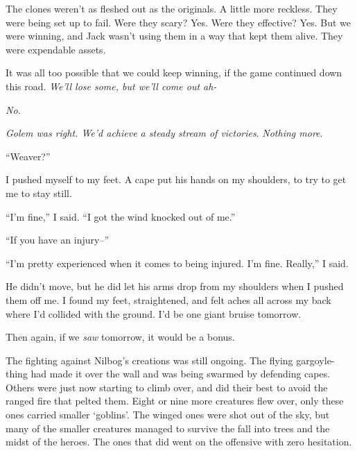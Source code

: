 The clones weren't as fleshed out as the originals.  A little more reckless.  They were being set up to fail.  Were they scary?  Yes.  Were they effective?  Yes.  But we were winning, and Jack wasn't using them in a way that kept them alive.  They were expendable assets.



It was all too possible that we could keep winning, if the game continued down this road.  \emph{We'll lose some, but we'll come out ah-}



\emph{No.}



\emph{Golem was right.  We'd achieve a steady stream of victories}.  \emph{Nothing more}.



``Weaver?''



I pushed myself to my feet.  A cape put his hands on my shoulders, to try to get me to stay still.



``I'm fine,'' I said.  ``I got the wind knocked out of me.''



``If you have an injury--''



``I'm pretty experienced when it comes to being injured.  I'm fine.  Really,'' I said.



He didn't move, but he did let his arms drop from my shoulders when I pushed them off me.  I found my feet, straightened, and felt aches all across my back where I'd collided with the ground.  I'd be one giant bruise tomorrow.



Then again, if we \emph{saw} tomorrow, it would be a bonus.



The fighting against Nilbog's creations was still ongoing.  The flying gargoyle-thing had made it over the wall and was being swarmed by defending capes.  Others were just now starting to climb over, and did their best to avoid the ranged fire that pelted them.  Eight or nine more creatures flew over, only these ones carried smaller `goblins'.  The winged ones were shot out of the sky, but many of the smaller creatures managed to survive the fall into trees and the midst of the heroes.   The ones that did went on the offensive with zero hesitation.



